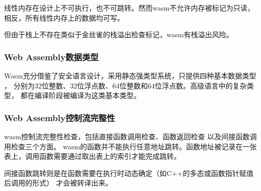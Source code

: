         线性内存在设计上不可执行，也不可跳转。然而wasm不允许内存被标记为只读，
        相反，所有线性内存上的数据均可写\cite{lehmannEverythingOldNew}。

        但由于栈上不存在类似于金丝雀的栈溢出检查标记，wasm有栈溢出风险。

    \subsubsection{Web Assembly数据类型}
        Wasm充分借鉴了安全语言设计，采用静态强类型系统，只提供四种基本数据类型
        \cite{wasmCommunityGroup,lehmannEverythingOldNew}，
        分别为32位整数、32位浮点数、64位整数和64位浮点数。高级语言中的复杂类型，
        都在编译阶段被编译为这类基本类型。
    \subsubsection{Web Assembly控制流完整性}
        wasm控制流完整性检查，包括直接函数调用检查、函数返回检查
        以及间接函数调用检查三个方面\cite{WebAssemblySummaryOnSecurity,Daniel2019DiscoveringVI}。
        wasm的函数并不能执行任意地址跳转。函数地址被记录在一张表上，调用函数需要通过取出表上的索引才能完成跳转。

        间接函数跳转则是在函数需要在执行时动态确定（如C++的多态或函数指针赋值后调用的形式）
        才会被转译出来\cite{Daniel2019DiscoveringVI}。
